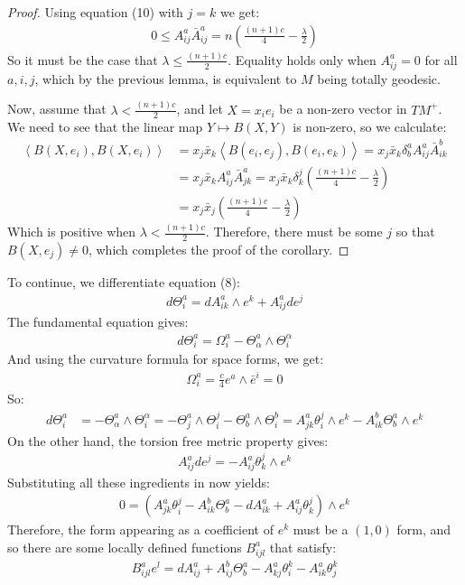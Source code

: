 \documentclass[11pt]{amsart}
\theoremstyle{definition}
\def \la { \left\langle }
\def \ra { \right\rangle }
\def \TMp{ TM^{+} }
\begin{document}
\begin{proof} Using equation (10) with $j=k$ we get:
%
\begin{align*}
0 \leq A^a_{ij} \bar{A}^a_{ij} = n \left( \frac{(n+1)c}{4} - \frac{\lambda}{2} \right)
\end{align*}
%
So it must be the case that $\lambda \leq \frac{(n+1)c}{2}$.  Equality holds only when $A^a_{ij} = 0$ for all $a,i,j$, which by the previous lemma, is equivalent to $M$ being totally geodesic.

Now, assume that $\lambda < \frac{(n+1)c}{2}$, and let $X = x_i e_i$ be a non-zero vector in $\TMp$.  We need to see that the linear map $Y \mapsto B(X,Y)$ is non-zero, so we calculate:
%
\begin{align*}
\la B(X, e_i), B(X, e_i) \ra &= x_j \bar{x}_k \la B(e_i, e_j), B(e_i, e_k) \ra = x_j \bar{x}_k \delta^a_b A^a_{ij} \bar{A}^b_{ik} \\
&= x_j \bar{x}_k A^a_{ij} \bar{A}^a_{jk} = x_j \bar{x}_k \delta^j_k \left( \frac{(n+1)c}{4} - \frac{\lambda}{2} \right) \\
&= x_j \bar{x}_j \left( \frac{(n+1)c}{4} - \frac{\lambda}{2} \right)
\end{align*}
%
Which is positive when $\lambda < \frac{(n+1)c}{2}$.  Therefore, there must be some $j$ so that $B(X,e_j) \neq 0$, which completes the proof of the corollary.
%
\end{proof}

To continue, we differentiate equation (8):
%
\begin{align*}
d \Theta^a_i = d A^a_{ik} \wedge e^k + A^a_{ij} d e^j
\end{align*}
%
The fundamental equation gives:
%
\begin{align*}
d \Theta^a_i = \Omega^a_i - \Theta^a_{\alpha} \wedge \Theta^{\alpha}_i
\end{align*}
%
And using the curvature formula for space forms, we get:
%
\begin{align*}
\Omega^a_i = \frac{c}{4} e^a \wedge \bar{e}^i = 0
\end{align*}
%
So:
%
\begin{align*}
d \Theta^a_i &= - \Theta^a_{\alpha} \wedge \Theta^{\alpha}_i = - \Theta^a_j \wedge \Theta^j_i - \Theta^a_b \wedge \Theta^b_i = A^a_{jk} \theta^j_i \wedge e^k - A^b_{ik} \Theta^a_b \wedge e^k
\end{align*}
%
On the other hand, the torsion free metric property gives:
%
\begin{align*}
A^a_{ij} d e^j = - A^a_{ij} \theta^j_k \wedge e^k
\end{align*}
%
Substituting all these ingredients in now yields:
%
\begin{align*}
0 = \left( A^a_{jk} \theta^j_i - A^b_{ik} \Theta^a_b - d A^a_{ik} + A^a_{ij} \theta^j_k \right) \wedge e^k
\end{align*}
%
Therefore, the form appearing as a coefficient of $e^k$ must be a $(1,0)$ form, and so there are some locally defined functions $B^a_{ijl}$ that satisfy:
%
\begin{align}
B^a_{ijl} e^l = d A^a_{ij} + A^b_{ij} \Theta^a_b - A^a_{kj} \theta^k_i - A^a_{ik} \theta^k_j
\end{align}
\end{document}
